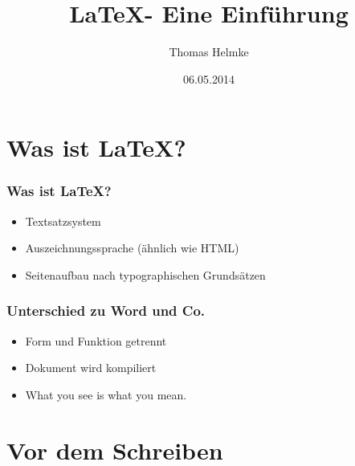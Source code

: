 \documentclass[svgnames]{beamer}
\title[\hshblogo]{\LaTeX - Eine Einführung}
\author{Thomas Helmke}
\date{06.05.2014}
\begin{document}
\maketitle
\frame{\tableofcontents}
 
\section{Was ist \LaTeX?}
\begin{frame}[<+->] %
	\frametitle{Was ist \LaTeX?} %
	\begin{itemize}
		\item Textsatzsystem
		\item Auszeichnungssprache (ähnlich wie HTML)
		\item Seitenaufbau nach typographischen Grundsätzen
	\end{itemize}
\end{frame}
\begin{frame}[<+->] %
	\frametitle{Unterschied zu Word und Co.} %
	\begin{itemize}
		\item Form und Funktion getrennt
		\item Dokument wird kompiliert
		\item What you see is what you mean.
	\end{itemize}
\end{frame}

\setbeamercovered{}
\section{Vor dem Schreiben}
\end{document}

